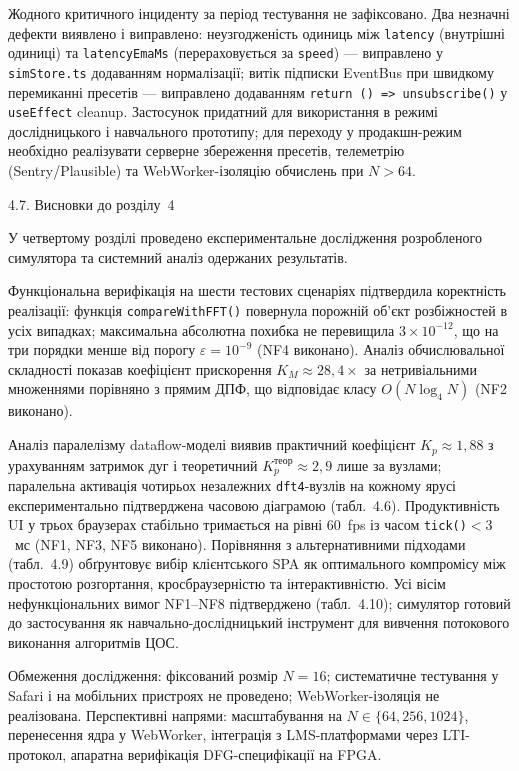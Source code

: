 Жодного критичного інциденту за період тестування не зафіксовано. Два
незначні дефекти виявлено і виправлено: неузгодженість одиниць між
\texttt{latency} (внутрішні одиниці) та \texttt{latencyEmaMs}
(перераховується за \texttt{speed}) --- виправлено у \texttt{simStore.ts}
додаванням нормалізації; витік підписки EventBus при швидкому перемиканні
пресетів --- виправлено додаванням \texttt{return () => unsubscribe()} у
\texttt{useEffect} cleanup. Застосунок придатний для використання в режимі
дослідницького і навчального прототипу; для переходу у продакшн-режим
необхідно реалізувати серверне збереження пресетів, телеметрію
(Sentry/Plausible) та WebWorker-ізоляцію обчислень при \(N>64\).

\protect{}\label{_Toc229681188}{}4.7. Висновки до розділу~4

У четвертому розділі проведено експериментальне дослідження розробленого
симулятора та системний аналіз одержаних результатів.

Функціональна верифікація на шести тестових сценаріях підтвердила
коректність реалізації: функція \texttt{compareWithFFT()} повернула
порожній об'єкт розбіжностей в усіх випадках; максимальна абсолютна
похибка не перевищила \(3\times10^{-12}\), що на три порядки менше від
порогу \(\varepsilon=10^{-9}\) (NF4 виконано). Аналіз обчислювальної
складності показав коефіцієнт прискорення \(K_M\approx28{,}4\times\) за
нетривіальними множеннями порівняно з прямим ДПФ, що відповідає класу
\(O(N\log_4 N)\) (NF2 виконано).

Аналіз паралелізму dataflow-моделі виявив практичний коефіцієнт
\(K_p\approx1{,}88\) з урахуванням затримок дуг і теоретичний
\(K_p^{теор}\approx2{,}9\) лише за вузлами; паралельна активація
чотирьох незалежних \texttt{dft4}-вузлів на кожному ярусі
експериментально підтверджена часовою діаграмою (табл.~4.6). Продуктивність
UI у трьох браузерах стабільно тримається на рівні 60~fps із часом
\texttt{tick()}\(<3\)~мс (NF1, NF3, NF5 виконано). Порівняння з
альтернативними підходами (табл.~4.9) обґрунтовує вибір клієнтського SPA
як оптимального компромісу між простотою розгортання, кросбраузерністю
та інтерактивністю. Усі вісім нефункціональних вимог NF1--NF8 підтверджено
(табл.~4.10); симулятор готовий до застосування як навчально-дослідницький
інструмент для вивчення потокового виконання алгоритмів ЦОС.

Обмеження дослідження: фіксований розмір \(N=16\); систематичне
тестування у Safari і на мобільних пристроях не проведено; WebWorker-ізоляція
не реалізована. Перспективні напрями: масштабування на
\(N\in\{64,256,1024\}\), перенесення ядра у WebWorker, інтеграція з
LMS-платформами через LTI-протокол, апаратна верифікація DFG-специфікації
на FPGA.